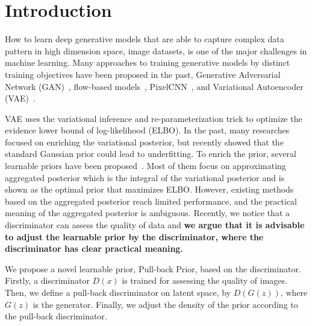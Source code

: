 \section{Introduction}

How to learn deep generative models that are able to capture complex data pattern in high dimension space, \EG image datasets, is one of the major challenges in machine learning. Many approaches to training generative models by distinct training objectives have been proposed in the past, \EG Generative Adversarial Network (GAN)~\cite{goodfellow2014generative}, flow-based models~\cite{dinh2016density,kingma2018glow}, PixelCNN~\cite{van2016conditional}, and Variational Autoencoder (VAE)~\cite{kingma2014auto,rezende_stochastic_2014}.

VAE uses the variational inference and re-parameterization trick to optimize the evidence lower bound of log-likelihood (ELBO). In the past, many researches~\cite{kingma2016improved,tomczak2016improving} focused on enriching the variational posterior, but recently \cite{tomczak2018vae} showed that the standard Gaussian prior could lead to underfitting. To enrich the prior, several learnable priors have been proposed~\cite{tomczak2018vae,bauer2019resampled,takahashi2019variational}. Most of them focus on approximating aggregated posterior which is the integral of the variational posterior and is shown as the optimal prior that maximizes ELBO. However, existing methods based on the aggregated posterior reach limited performance, and the practical meaning of the aggregated posterior is ambiguous. Recently, we notice that a discriminator can assess the quality of data and \textbf{we argue that it is advisable to adjust the learnable prior by the discriminator, where the discriminator has clear practical meaning. } 

We propose a novel learnable prior, Pull-back Prior, based on the discriminator.
Firstly, a discriminator $D(x)$ is trained for assessing the quality of images. Then, we define a pull-back discriminator on latent space, by $D(G(z))$, where $G(z)$ is the generator. Finally, we adjust the density of the prior according to the pull-back discriminator. 

